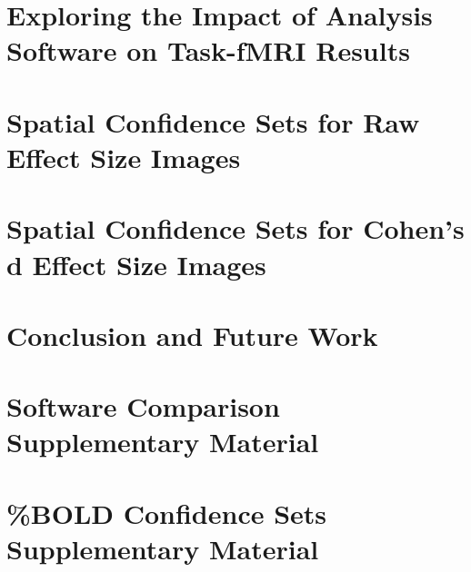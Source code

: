 \documentclass[11pt,a4paper]{report}      %
\begin{document}
\chapter{Exploring the Impact of Analysis Software on Task-fMRI Results}
\label{chap:software}


\chapter{Spatial Confidence Sets for Raw Effect Size Images}
\label{chap:BOLD}


\chapter{Spatial Confidence Sets for Cohen's d Effect Size Images}
\label{chap:cohen}


\chapter{Conclusion and Future Work}
\label{chap:conclusion}
%
%

\appendix                            %
\chapter{Software Comparison Supplementary Material}

\chapter{\%BOLD Confidence Sets Supplementary Material}

\end{document}
